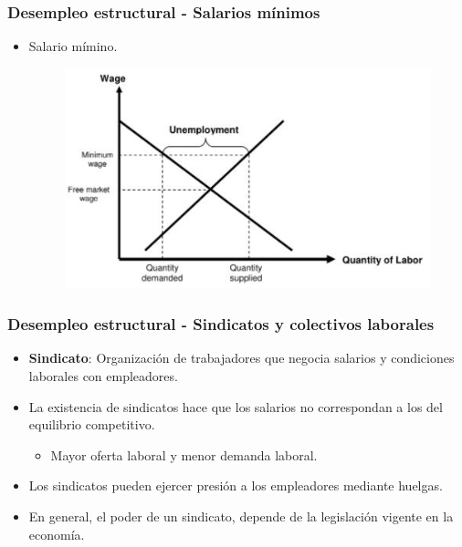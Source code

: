 \documentclass{beamer}
\begin{document}
\begin{frame}
\frametitle{Desempleo estructural - Salarios m\'inimos}
\begin{itemize}
\setlength\itemsep{1.4em}
\item Salario m\'imino.
\begin{center}
\begin{figure}
\includegraphics[scale=0.650]{Figuras/Ejemplo3}
\end{figure}
\end{center}
\end{itemize}
\end{frame}

\begin{frame}
\frametitle{Desempleo estructural - Sindicatos y colectivos laborales}
\begin{itemize}
\setlength\itemsep{1.4em}
\item \textbf{Sindicato}: Organizaci\'on de trabajadores que negocia salarios y condiciones laborales con empleadores.
\item La existencia de sindicatos hace que los salarios no correspondan a los del equilibrio competitivo.\\
\begin{itemize}
\item Mayor oferta laboral y menor demanda laboral.
\end{itemize}
\item Los sindicatos pueden ejercer presi\'on a los empleadores mediante huelgas.
\item En general, el poder de un sindicato, depende de la legislaci\'on vigente en la econom\'ia.
\end{itemize}
\end{frame}
\end{document}
